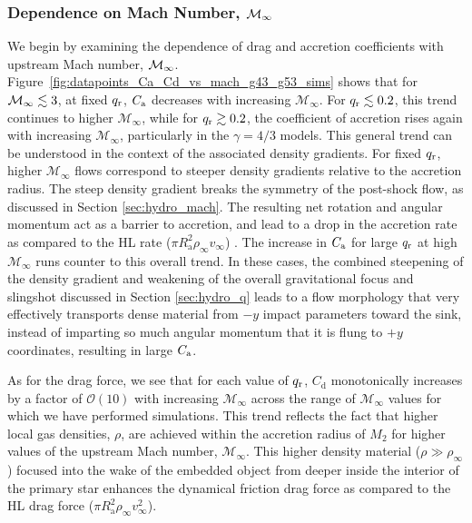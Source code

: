 \subsubsection{Dependence on Mach Number, ${\cal M}_\infty$}\label{sec:coeff_mach}

We begin by examining the dependence of drag and accretion coefficients with upstream Mach number, ${\cal M}_\infty$. 
Figure~\ref{fig:datapoints_Ca_Cd_vs_mach_g43_g53_sims} shows that for ${\cal M}_\infty \lesssim 3$, at fixed $q_{\rm r}$, $C_{\rm a}$ decreases with increasing $\mathcal{M}_\infty$. For $q_{\rm r}\lesssim0.2$, this trend continues to higher $\mathcal{M}_\infty$, while for $q_{\rm r} \gtrsim 0.2$, the coefficient of accretion rises again with increasing $\mathcal{M}_\infty$, particularly in the $\gamma=4/3$ models. This general trend can be understood in the context of the associated density gradients. For fixed $q_{\rm r}$, higher $\mathcal{M}_\infty$ flows correspond to steeper density gradients relative to the accretion radius. The steep density gradient breaks the symmetry of the post-shock flow, as discussed in Section \ref{sec:hydro_mach}. The resulting net rotation and  angular momentum act as a barrier to accretion, and lead to a drop in the accretion rate as compared to the HL rate ($\pi R_{\mathrm{a}}^2 \rho_\infty v_\infty$) \cite{MacLeod_2015}. The increase in $C_{\rm a}$ for large $q_{\rm r}$ at high $\mathcal{M}_\infty$  runs counter to this overall trend. In these cases, the combined steepening of the density gradient and weakening of the overall gravitational focus and slingshot discussed in Section \ref{sec:hydro_q} leads to a flow morphology that very effectively transports dense material from $-y$ impact parameters toward the sink, instead of imparting so much angular momentum that it is flung to $+y$ coordinates, resulting in large $C_{\rm a}$.

As for the drag force, we see that for each value of $q_{\rm r}$, $C_{\mathrm d}$ monotonically increases by a factor of $\mathcal{O}(10)$ with increasing $\mathcal{M}_\infty$ across the range of $\mathcal{M}_\infty$ values for which we have performed simulations. This trend reflects the fact that higher local gas densities, $\rho$, are achieved within the accretion radius of $M_2$ for higher values of the upstream Mach number, $\mathcal{M}_\infty$. This higher density material ($\rho \gg \rho_\infty$) focused into the wake of the embedded object from deeper inside the interior of the primary star enhances the dynamical friction drag force as compared to the HL drag force ($\pi R_{\mathrm{a}}^2 \rho_\infty v_\infty^2$).


